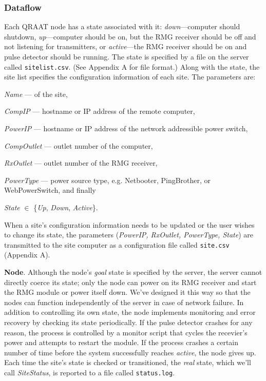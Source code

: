 \documentclass[letter]{article}
\begin{document}
\subsubsection{Dataflow}
Each QRAAT node has a state associated with it: \textit{down}---computer should shutdown,
\textit{up}---computer should be on, but the RMG receiver should be off and not listening 
for transmitters, or \textit{active}---the RMG receiver should be on and pulse detector should
be running. The state is specified by a file on the server called \texttt{sitelist.csv}.
(See Appendix A for file format.) Along with the state, the site list specifies the 
configuration information of each site. The parameters are:
\begin{description}
  \item \textit{Name} --- of the site, 
  \item \textit{CompIP} --- hostname or IP address of the remote computer, 
  \item \textit{PowerIP} --- hostname or IP address of the network addressible power switch,
  \item \textit{CompOutlet} --- outlet number of the computer, 
  \item \textit{RxOutlet} --- outlet number of the RMG receiver, 
  \item \textit{PowerType} --- power source type, e.g. Netbooter, PingBrother, or WebPowerSwitch, and finally
  \item \textit{State} $\in$ \{\textit{Up}, \textit{Down}, \textit{Active}\}.
\end{description}

When a site's configuration information needs to be updated or the user wishes to change 
its state, the parameters (\textit{PowerIP, RxOutlet, PowerType, State}) are transmitted to the
site computer as a configuration file called \texttt{site.csv} (Appendix A). 

\textbf{Node}. Although the node's \textit{goal} state is specified by the server, the server
cannot directly coerce its state; only the node can power on its RMG receiver and start the RMG
module or power itself down. We've designed it this way so that the nodes can function independently
of the server in case of network failure. In addition to controlling its own state, the node 
implements monitoring and error recovery by checking its state periodically. If the pulse detector
crashes for any reason, the process is controlled by a monitor script that cycles the recevier's 
power and attempts to restart the module. If the process crashes a certain number of time before 
the system successfully reaches \textit{active}, the node gives up. Each time the site's state is 
checked or transitioned, the \textit{real} state, which we'll call \textit{SiteStatus}, is 
reported to a file called \texttt{status.log}. 
\end{document}
